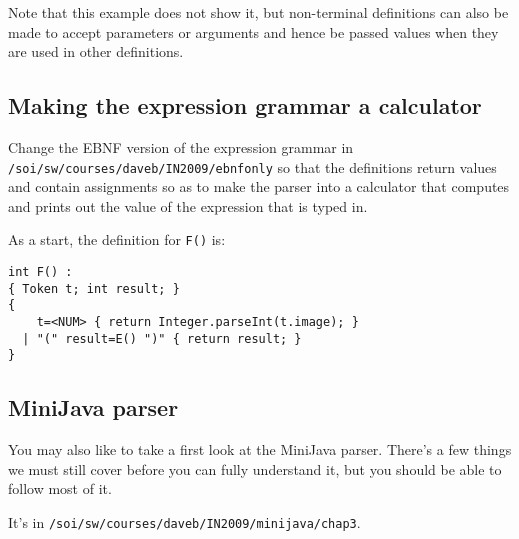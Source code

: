 \documentclass{article}
\begin{document}
Note that this example does not show it, but non-terminal
definitions can also be made to accept parameters or arguments 
and hence be passed values when they are used in
other definitions.

\subsection*{Making the expression grammar a calculator}

Change the EBNF version of the
expression grammar in \verb+/soi/sw/courses/daveb/IN2009/ebnfonly+
so that the definitions return values and contain assignments
so as to make the parser into a calculator that 
computes and prints out the value of the
expression that is typed in.

As a start, the definition for \verb+F()+ is:
\begin{verbatim}
int F() :
{ Token t; int result; }
{
    t=<NUM> { return Integer.parseInt(t.image); }
  | "(" result=E() ")" { return result; }
}
\end{verbatim}

\subsection*{MiniJava parser}

You may also like to take a first look at the MiniJava parser.
There's a few things we must still cover before you can fully 
understand it, but you should be able to follow most of it.

It's in \verb+/soi/sw/courses/daveb/IN2009/minijava/chap3+.
\end{document}
